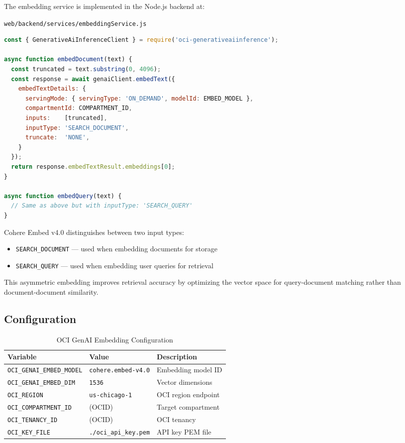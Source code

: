 \documentclass[12pt,a4paper]{article}
\begin{document}
The embedding service is implemented in the Node.js backend at:

\texttt{web/backend/services/embeddingService.js}

\begin{lstlisting}[language=JavaScript, caption={OCI GenAI Embedding Service (simplified)}]
const { GenerativeAiInferenceClient } = require('oci-generativeaiinference');

async function embedDocument(text) {
  const truncated = text.substring(0, 4096);
  const response = await genaiClient.embedText({
    embedTextDetails: {
      servingMode: { servingType: 'ON_DEMAND', modelId: EMBED_MODEL },
      compartmentId: COMPARTMENT_ID,
      inputs:    [truncated],
      inputType: 'SEARCH_DOCUMENT',
      truncate:  'NONE',
    }
  });
  return response.embedTextResult.embeddings[0];
}

async function embedQuery(text) {
  // Same as above but with inputType: 'SEARCH_QUERY'
}
\end{lstlisting}

\begin{infobox}
Cohere Embed v4.0 distinguishes between two input types:
\begin{itemize}
  \item \texttt{SEARCH\_DOCUMENT} — used when embedding documents for storage
  \item \texttt{SEARCH\_QUERY} — used when embedding user queries for retrieval
\end{itemize}
This asymmetric embedding improves retrieval accuracy by optimizing the vector space for query-document matching rather than document-document similarity.
\end{infobox}

\subsection{Configuration}

\begin{table}[H]
\centering
\caption{OCI GenAI Embedding Configuration}
\begin{tabularx}{\textwidth}{l l X}
\toprule
\textbf{Variable} & \textbf{Value} & \textbf{Description} \\
\midrule
\texttt{OCI\_GENAI\_EMBED\_MODEL} & \texttt{cohere.embed-v4.0} & Embedding model ID \\
\texttt{OCI\_GENAI\_EMBED\_DIM} & \texttt{1536} & Vector dimensions \\
\texttt{OCI\_REGION} & \texttt{us-chicago-1} & OCI region endpoint \\
\texttt{OCI\_COMPARTMENT\_ID} & (OCID) & Target compartment \\
\texttt{OCI\_TENANCY\_ID} & (OCID) & OCI tenancy \\
\texttt{OCI\_KEY\_FILE} & \texttt{./oci\_api\_key.pem} & API key PEM file \\
\bottomrule
\end{tabularx}
\end{table}
\end{document}
